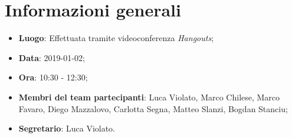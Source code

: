 \section{Informazioni generali}
\begin{itemize}
	\item \textbf{Luogo}: Effettuata tramite videoconferenza \textit{Hangouts}; 
	\item \textbf{Data}: 2019-01-02; 
	\item \textbf{Ora}: 10:30 - 12:30; 
	\item \textbf{Membri del team partecipanti}: Luca Violato, Marco Chilese, Marco Favaro, 
	Diego Mazzalovo, Carlotta Segna, Matteo Slanzi, Bogdan Stanciu; 
	\item \textbf{Segretario}: Luca Violato. 
\end{itemize}






